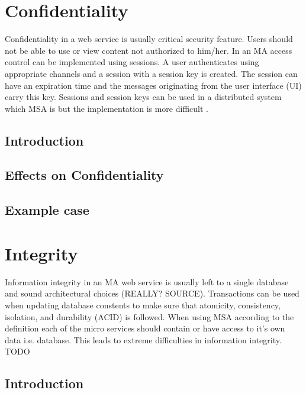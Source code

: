 \section{Confidentiality}
\begin{sloppypar}

    Confidentiality in a web service is usually critical security feature. 
    Users should not be able to use or view content not authorized to him/her. 
    In an MA access control can be implemented using sessions. 
    A user authenticates using appropriate channels and a session with a session key is created. 
    The session can have an expiration time and the messages originating from 
    the user interface (UI) carry this key. Sessions and session keys can be used 
    in a distributed system which MSA is but the implementation is more difficult \citep{authinmsa}.

\end{sloppypar}



\subsection{Introduction}


\subsection{Effects on Confidentiality}
\subsection{Example case}

\section{Integrity}
\begin{sloppypar}
    Information integrity in an MA web service is usually left to a single database 
    and sound architectural choices (REALLY? SOURCE).
    Transactions can be used when updating database constents to make sure that
    atomicity, consistency, isolation, and durability (ACID) \citep{acid} is followed.
    When using MSA according to the definition each of the micro services should contain 
    or have access to it's own data i.e. database. This leads to extreme difficulties in information integrity.
    TODO
\end{sloppypar}


\subsection{Introduction}
